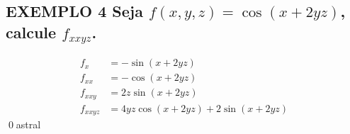 \documentclass[a4paper, 12pt]{extreport}
\begin{document}
      \subsection*{\small {\color{astral}EXEMPLO 4} \textmd{Seja $f(x,y,z) = \cos{(x+2yz)}$, calcule $f_{xxyz}$.}}
        \vspace{-8mm}
        \begin{equation*}
          \begin{split}
            f_x & = -\sin{(x+2yz)} \\
            f_{xx} & = -\cos{(x+2yz)} \\
            f_{xxy} & = 2z\sin{(x+2yz)} \\
            f_{xxyz} & = 4yz\cos{(x+2yz)} + 2\sin{(x+2yz)}
          \end{split}
        \end{equation*}
        \qed{astral}
\end{document}
